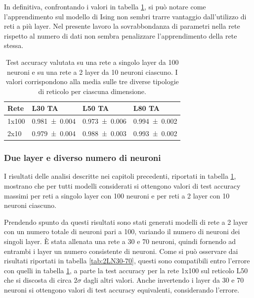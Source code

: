\documentclass{article}
\begin{document}
In definitiva, confrontando i valori in tabella \ref{tab:NNLN}, si può notare come l'apprendimento sul modello di Ising non sembri trarre vantaggio dall'utilizzo di reti a più layer.
Nel presente lavoro la sovrabbondanza di parametri nella rete rispetto al numero di dati non sembra penalizzare l'apprendimento della rete stessa.

\begin{table}[ht]
\begin{center}
\begin{tabular}{llll}
\toprule
Rete & L30 TA & L50 TA & L80 TA \\
\midrule
1x100 & \num{0.981 \pm 0.004} & \num{0.973 \pm 0.006} & \num{0.994 \pm 0.002} \\
2x10 & \num{0.979 \pm 0.004} & \num{0.988 \pm 0.003} & \num{0.993 \pm 0.002} \\
\bottomrule
\end{tabular}
\end{center}
\caption{Test accuracy valutata su una rete a singolo layer da 100 neuroni e su una rete a 2 layer da 10 neuroni ciascuno. I valori corrispondono alla media sulle tre diverse tipologie di reticolo per ciascuna dimensione.}
\label{tab:NNLN}
\end{table}

\subsubsection{Due layer e diverso numero di neuroni}\label{sec:2Ln}
I risultati delle analisi descritte nei capitoli precedenti, riportati in tabella \ref{tab:NNLN}, mostrano che per tutti modelli considerati si ottengono valori di test accuracy massimi per reti a singolo layer con 100 neuroni e per reti a 2 layer con 10 neuroni ciascuno.

Prendendo spunto da questi risultati sono stati generati modelli di rete a 2 layer con un numero totale di neuroni pari a 100, variando il numero di neuroni dei singoli layer.
È stata allenata una rete a 30 e 70 neuroni, quindi fornendo ad entrambi i layer un numero consistente di neuroni.
Come si può osservare dai risultati riportati in tabella \ref{tab:2LN30-70}, questi sono compatibili entro l'errore con quelli in tabella \ref{tab:NNLN}, a parte la test accuracy per la rete 1x100 sul reticolo L50 che si discosta di circa $2\sigma$ dagli altri valori.
Anche invertendo i layer da 30 e 70 neuroni si ottengono valori di test accuracy equivalenti, considerando l'errore.
\end{document}
